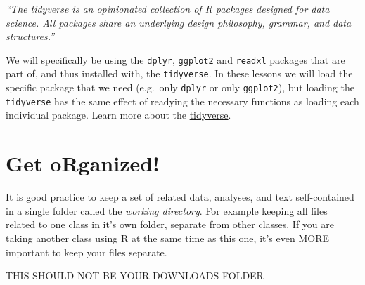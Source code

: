 \documentclass[
  letterpaper,
  DIV=11,
  numbers=noendperiod,
  oneside]{scrreprt}
\begin{document}
\begin{tcolorbox}[enhanced jigsaw, bottomrule=.15mm, colback=white, colframe=quarto-callout-note-color-frame, toprule=.15mm, coltitle=black, rightrule=.15mm, opacitybacktitle=0.6, colbacktitle=quarto-callout-note-color!10!white, toptitle=1mm, leftrule=.75mm, breakable, bottomtitle=1mm, titlerule=0mm, title=\textcolor{quarto-callout-note-color}{\faInfo}\hspace{0.5em}{A note about the \texttt{tidyverse}.}, arc=.35mm, left=2mm, opacityback=0]

\emph{``The tidyverse is an opinionated collection of R packages
designed for data science. All packages share an underlying design
philosophy, grammar, and data structures.''}

We will specifically be using the \texttt{dplyr}, \texttt{ggplot2} and
\texttt{readxl} packages that are part of, and thus installed with, the
\texttt{tidyverse}. In these lessons we will load the specific package
that we need (e.g.~only \texttt{dplyr} or only \texttt{ggplot2}), but
loading the \texttt{tidyverse} has the same effect of readying the
necessary functions as loading each individual package. Learn more about
the \href{https://tidyverse.org/}{tidyverse}.

\end{tcolorbox}

\section{Get oRganized!}\label{get-organized}

It is good practice to keep a set of related data, analyses, and text
self-contained in a single folder called the \emph{working directory}.
For example keeping all files related to one class in it's own folder,
separate from other classes. If you are taking another class using R at
the same time as this one, it's even MORE important to keep your files
separate.

\begin{tcolorbox}[enhanced jigsaw, bottomrule=.15mm, colback=white, colframe=quarto-callout-important-color-frame, toprule=.15mm, coltitle=black, rightrule=.15mm, opacitybacktitle=0.6, colbacktitle=quarto-callout-important-color!10!white, toptitle=1mm, leftrule=.75mm, breakable, bottomtitle=1mm, titlerule=0mm, title=\textcolor{quarto-callout-important-color}{\faExclamation}\hspace{0.5em}{Important}, arc=.35mm, left=2mm, opacityback=0]

THIS SHOULD NOT BE YOUR DOWNLOADS FOLDER

\end{tcolorbox}
\end{document}
